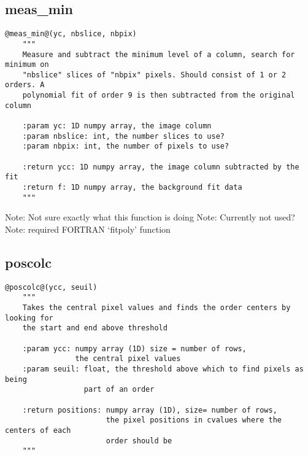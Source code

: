 \vspace{0.5cm}
\subsection{meas\_min}
\begin{lstlisting}[style=pythonstyle]
@meas_min@(yc, nbslice, nbpix)
    """
    Measure and subtract the minimum level of a column, search for minimum on
    "nbslice" slices of "nbpix" pixels. Should consist of 1 or 2 orders. A
    polynomial fit of order 9 is then subtracted from the original column

    :param yc: 1D numpy array, the image column
    :param nbslice: int, the number slices to use?
    :param nbpix: int, the number of pixels to use?

    :return ycc: 1D numpy array, the image column subtracted by the fit
    :return f: 1D numpy array, the background fit data
    """
\end{lstlisting}

\noindent Note: Not sure exactly what this function is doing
\noindent Note: Currently not used?
\noindent Note: required FORTRAN `fitpoly' function

\vspace{0.5cm}
\subsection{poscolc}
\begin{lstlisting}[style=pythonstyle]
@poscolc@(ycc, seuil)
    """
    Takes the central pixel values and finds the order centers by looking for
    the start and end above threshold

    :param ycc: numpy array (1D) size = number of rows,
                the central pixel values
    :param seuil: float, the threshold above which to find pixels as being
                  part of an order

    :return positions: numpy array (1D), size= number of rows,
                       the pixel positions in cvalues where the centers of each
                       order should be
    """
\end{lstlisting}

\vspace{0.5cm}

